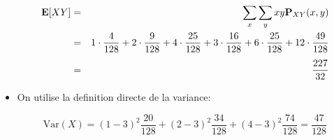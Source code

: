 \documentclass[a4paper]{tufte-handout}
\newcommand{\E}{\mathbf{E}}
\begin{document}
\begin{itemize}
    \begin{eqnarray*}
      \E[XY] & = & \sum_x\sum_y xy\P_{XY}(x,y)  \\
             & = & 1\cdot \frac{4}{128} + 2\cdot \frac{9}{128}
             + 4\cdot \frac{25}{128} 
            + 3\cdot \frac{16}{128}
           + 6\cdot \frac{25}{128}
           + 12\cdot \frac{49}{128}\\[4pt]
             &= & \frac{227}{32}
    \end{eqnarray*}
  \item On utilise la definition directe de la variance:

    $$
    \text{Var}(X) = (1-3)^2 \frac{20}{128} + (2-3)^2 \frac{34}{128} + (4-3)^2
    \frac{74}{128} = \frac{47}{128}
    $$
\end{itemize}
\end{document}
